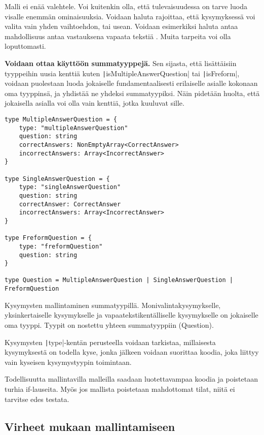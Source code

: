 Malli ei enää valehtele. Voi kuitenkin olla, että tulevaisuudessa on tarve luoda visalle enemmän ominaisuuksia. Voidaan haluta rajoittaa, että kysymyksessä voi valita vain yhden vaihtoehdon, tai usean. Voidaan esimerkiksi haluta antaa mahdollisuus antaa vastauksena vapaata tekstiä \cite{impossiblebetter}. Muita tarpeita voi olla loputtomasti.

\textbf{Voidaan ottaa käyttöön summatyyppejä.} Sen sijasta, että lisättäisiin tyyppeihin uusia kenttiä kuten \texttt|isMultipleAnswerQuestion| tai \texttt|isFreform|, voidaan puolestaan luoda jokaiselle fundamentaalisesti erilaiselle asialle kokonaan oma tyyppinsä, ja yhdistää ne yhdeksi summatyypiksi. Näin pidetään huolta, että jokaisella asialla voi olla vain kenttiä, jotka kuuluvat sille.

\begin{code}
    \begin{verbatim}
type MultipleAnswerQuestion = {
    type: "multipleAnswerQuestion"
    question: string
    correctAnswers: NonEmptyArray<CorrectAnswer>
    incorrectAnswers: Array<IncorrectAnswer>
}

type SingleAnswerQuestion = {
    type: "singleAnswerQuestion"
    question: string
    correctAnswer: CorrectAnswer
    incorrectAnswers: Array<IncorrectAnswer>
}

type FreformQuestion = {
    type: "freformQuestion"
    question: string
}

type Question = MultipleAnswerQuestion | SingleAnswerQuestion | FreformQuestion
    \end{verbatim}
    \caption{Kysymysten mallintaminen summatyypillä. Monivalintakysymykselle, yksinkertaiselle kysymykselle ja vapaatekstikentälliselle kysymykselle on jokaiselle oma tyyppi. Tyypit on nostettu yhteen summatyyppiin (Question).}
    \label{code:ts_sum_type_nice}
\end{code}

Kysymysten \texttt|type|-kentän perusteella voidaan tarkistaa, millaisesta kysymyksestä on todella kyse, jonka jälkeen voidaan suorittaa koodia, joka liittyy vain kyseisen kysymystyypin toimintaan.

Todellisuutta mallintavilla malleilla saadaan luotettavampaa koodia ja poistetaan turhia if-lauseita. Myös jos mallista poistetaan mahdottomat tilat, niitä ei tarvitse edes testata.

\subsection{Virheet mukaan mallintamiseen}

